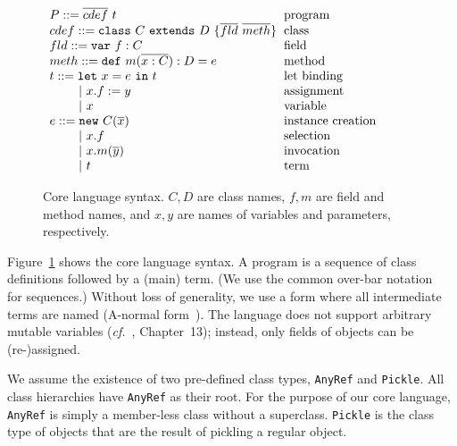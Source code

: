 \documentclass[preprint,10pt]{sigplanconf}
\theoremstyle{definition}
\theoremstyle{definition}
\newcommand{\gap}{\quad\quad}
\newcommand{\ba}{\begin{array}}
\newcommand{\ea}{\end{array}}
\newcommand{\seq}[1]{\overline{#1}}
\begin{document}
\begin{figure}
  \centering
$\ba[t]{l@{\hspace{2mm}}l}
P    ::=  \seq{cdef}~t                           & \mbox{program}             \\
cdef ::=  \texttt{class}~C~\texttt{extends}~D~\{\seq{fld}~\seq{meth}\} & \mbox{class} \\
fld  ::=  \texttt{var}~f: C                      & \mbox{field}               \\
meth ::=  \texttt{def}~m(\seq{x: C}): D = e      & \mbox{method}              \\
t    ::=  \texttt{let}~x = e~\texttt{in}~t       & \mbox{let binding}         \\
\gap ~|~ x.f := y                                & \mbox{assignment}          \\
\gap ~|~ x                                       & \mbox{variable}            \\
e    ::=  \texttt{new}~C(\seq{x})                & \mbox{instance creation}   \\
\gap ~|~ x.f                                     & \mbox{selection}           \\
\gap ~|~ x.m(\seq{y})                            & \mbox{invocation}          \\
\gap ~|~ t                                       & \mbox{term}                \\
\ea$
  \caption{Core language syntax. $C,D$ are class names, $f,m$ are ﬁeld and
    method names, and $x,y$ are names of variables and parameters, respectively.}
  \label{fig:lang-syntax}
\end{figure}


Figure~\ref{fig:lang-syntax} shows the core language syntax. A program is a
sequence of class definitions followed by a (main) term. (We use the common
over-bar notation~\cite{Igarashi2001} for sequences.) Without loss of
generality, we use a form where all intermediate terms are named (A-normal
form~\cite{Flanagan93}). The language does not support arbitrary mutable
variables ({\em cf.}~\cite{TAPL}, Chapter~13); instead, only fields of objects
can be (re-)assigned.

We assume the existence of two pre-defined class types, \verb|AnyRef| and
\verb|Pickle|. All class hierarchies have \verb|AnyRef| as their root. For the
purpose of our core language, \verb|AnyRef| is simply a member-less class
without a superclass. \verb|Pickle| is the class type of objects that are the
result of pickling a regular object.
\end{document}
